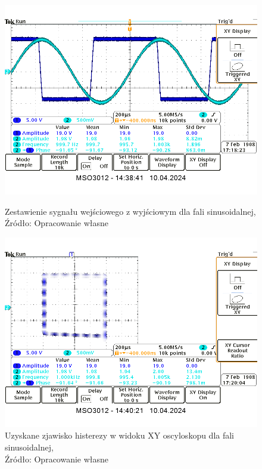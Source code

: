 \documentclass{article}
\begin{document}
      \begin{figure}[!ht]
        \begin{minipage}{.5\textwidth}
            \centering
            \includegraphics[scale=0.35]{grafiki/sin_wyj.png}
            \caption{Zestawienie sygnału wejściowego z wyjściowym dla fali sinusoidalnej,
            \\Źródło: Opracowanie własne}
        \end{minipage}
        \begin{minipage}{.5\textwidth}
            \centering
            \includegraphics[scale=0.35]{grafiki/sin_Histereza.png} 
            \caption{Uzyskane zjawisko histerezy w widoku XY oscyloskopu dla fali sinusoidalnej,
            \\Źródło: Opracowanie własne}
        \end{minipage}
      \end{figure}
      \pagebreak
\end{document}

